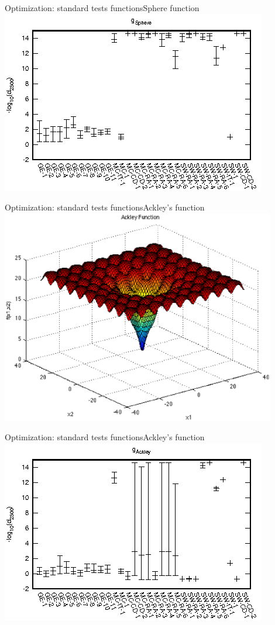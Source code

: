 \documentclass[10pt]{beamer}
\begin{document}
\begin{frame}{Optimization: standard tests functions}{Sphere function}
	\includegraphics[width=\textwidth]{Sphere-e.eps}
\end{frame}

\begin{frame}{Optimization: standard tests functions}{Ackley's function}
	\includegraphics[width=0.9\textwidth]{ackley-function.eps}
\end{frame}

\begin{frame}{Optimization: standard tests functions}{Ackley's function}
	\includegraphics[width=\textwidth]{Ackley-e.eps}
\end{frame}
\end{document}
